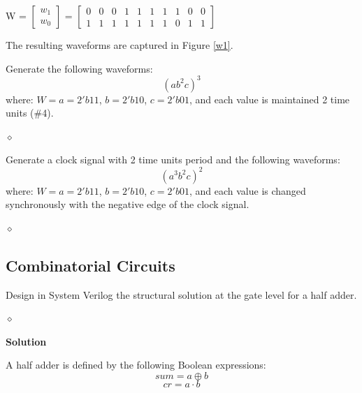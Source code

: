 W =
$\begin{bmatrix}
w_1 \\
w_0
\end{bmatrix}$
=
$\begin{bmatrix}
0 & 0 & 0 & 1 & 1 & 1 & 1 & 1 & 0 & 0\\
1 & 1 & 1 & 1 & 1 & 1 & 1 & 0 & 1 & 1
\end{bmatrix}$

                    
The resulting waveforms are captured in Figure \ref{w1}.



\begin{problem}
Generate the following waveforms:
$$(ab^2c)^3$$
where: $W = a = 2'b11$, $b = 2'b10$, $c = 2'b01$,  and each value is maintained 2 time units (\#4).

$\diamond$
\end{problem}


\begin{problem}
Generate a clock signal with 2 time units period and the following waveforms:
$$(a^3b^2c)^2$$
where: $W = a = 2'b11$, $b = 2'b10$, $c = 2'b01$,  and each value is changed synchronously with the negative edge of the clock signal.

$\diamond$
\end{problem}


\subsection{Combinatorial Circuits}

\begin{problem}
Design in System Verilog the structural solution at the gate level for a half adder.

$\diamond$
\end{problem}

{\bf Solution}

A half adder is defined by the following Boolean expressions:
$$sum = a \oplus b$$
$$cr = a \cdot b$$



